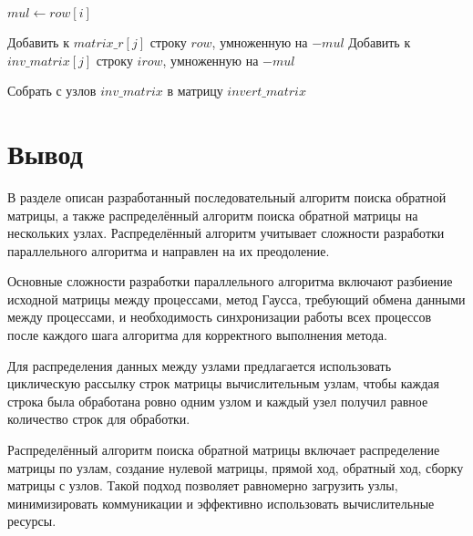 \begin{small}
\begin{algorithm}[H]
\begin{algorithmic}[1]
                        \State $mul \gets row[i]$

                        \State Добавить к $matrix\_r[j]$ строку $row$, умноженную на $-mul$
                        \State Добавить к $inv\_matrix[j]$ строку $irow$, умноженную на $-mul$
                    \EndFor
                \EndFor


                \State Собрать с узлов $inv\_matrix$ в матрицу $invert\_matrix$

            \EndProcedure
        \end{algorithmic}
    \end{algorithm}
\end{small}


\section*{Вывод}

В разделе описан разработанный последовательный алгоритм поиска обратной матрицы, а также распределённый алгоритм поиска обратной матрицы на нескольких узлах. Распределённый алгоритм учитывает сложности разработки параллельного алгоритма и направлен на их преодоление.

Основные сложности разработки параллельного алгоритма включают разбиение исходной матрицы между процессами, метод Гаусса, требующий обмена данными между процессами, и необходимость синхронизации работы всех процессов после каждого шага алгоритма для корректного выполнения метода.

Для распределения данных между узлами предлагается использовать циклическую рассылку строк матрицы вычислительным узлам, чтобы каждая строка была обработана ровно одним узлом и каждый узел получил равное количество строк для обработки.

Распределённый алгоритм поиска обратной матрицы включает распределение матрицы по узлам, создание нулевой матрицы, прямой ход, обратный ход, сборку матрицы с узлов. Такой подход позволяет равномерно загрузить узлы, минимизировать коммуникации и эффективно использовать вычислительные ресурсы.